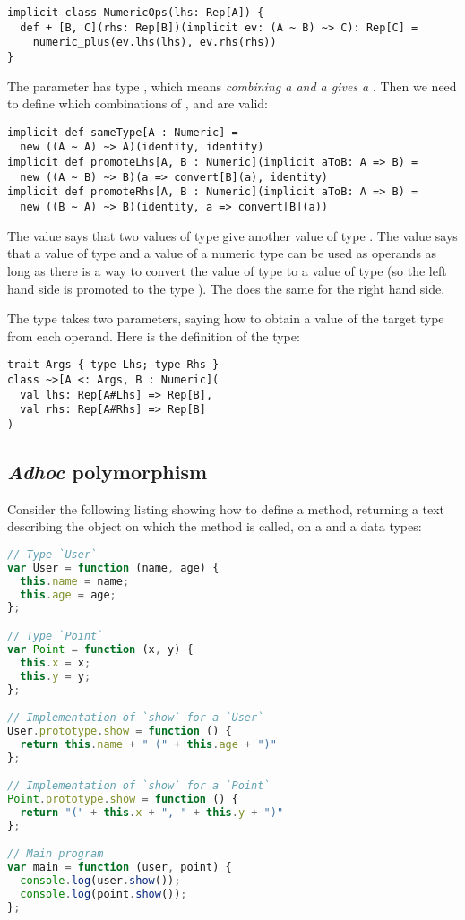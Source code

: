 \documentclass[american,english,runningheads]{llncs}
\begin{document}
\begin{lstlisting}
implicit class NumericOps(lhs: Rep[A]) {
  def + [B, C](rhs: Rep[B])(implicit ev: (A ~ B) ~> C): Rep[C] =
    numeric_plus(ev.lhs(lhs), ev.rhs(rhs))
}
\end{lstlisting}

The  parameter has type , which means \emph{combining a  and a  gives a }. Then we need to define which combinations of ,  and  are valid:

\begin{lstlisting}
implicit def sameType[A : Numeric] =
  new ((A ~ A) ~> A)(identity, identity)
implicit def promoteLhs[A, B : Numeric](implicit aToB: A => B) =
  new ((A ~ B) ~> B)(a => convert[B](a), identity)
implicit def promoteRhs[A, B : Numeric](implicit aToB: A => B) =
  new ((B ~ A) ~> B)(identity, a => convert[B](a))
\end{lstlisting}

The  value says that two values of type  give another value of type . The  value says that a value of type  and a value of a numeric type  can be used as operands as long as there is a way to convert the value of type  to a value of type  (so the left hand side is promoted to the type ). The  does the same for the right hand side.

The \code{\~\>} type takes two parameters, saying how to obtain a value of the target type from each operand. Here is the definition of the \code{\~\>} type:

\begin{lstlisting}
trait Args { type Lhs; type Rhs }
class ~>[A <: Args, B : Numeric](
  val lhs: Rep[A#Lhs] => Rep[B],
  val rhs: Rep[A#Rhs] => Rep[B]
)
\end{lstlisting}


\subsection{\emph{Adhoc} polymorphism}

Consider the following listing showing how to define a  method, returning a text describing the object on which the method is called, on a  and a  data types:

\begin{lstlisting}[language=JavaScript]
// Type `User`
var User = function (name, age) {
  this.name = name;
  this.age = age;
};

// Type `Point`
var Point = function (x, y) {
  this.x = x;
  this.y = y;
};

// Implementation of `show` for a `User`
User.prototype.show = function () {
  return this.name + " (" + this.age + ")"
};

// Implementation of `show` for a `Point`
Point.prototype.show = function () {
  return "(" + this.x + ", " + this.y + ")"
};

// Main program
var main = function (user, point) {
  console.log(user.show());
  console.log(point.show());
};
\end{lstlisting}
\end{document}

